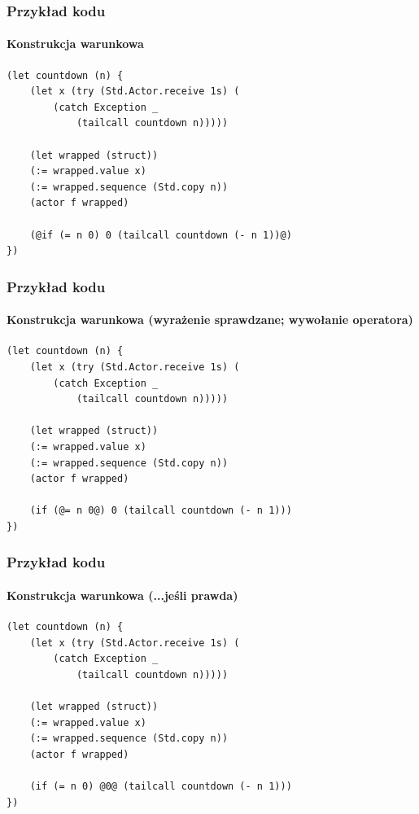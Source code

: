 \documentclass[aspectratio=169]{beamer}
\begin{document}
\begin{frame}[fragile]
    \frametitle{Przykład kodu}
    \framesubtitle{Konstrukcja warunkowa}

    \begin{small}
    \begin{lstlisting}
(let countdown (n) {
    (let x (try (Std.Actor.receive 1s) (
        (catch Exception _
            (tailcall countdown n)))))

    (let wrapped (struct))
    (:= wrapped.value x)
    (:= wrapped.sequence (Std.copy n))
    (actor f wrapped)

    (@if (= n 0) 0 (tailcall countdown (- n 1))@)
})
    \end{lstlisting}
    \end{small}
\end{frame}

\begin{frame}[fragile]
    \frametitle{Przykład kodu}
    \framesubtitle{Konstrukcja warunkowa (wyrażenie sprawdzane; wywołanie operatora)}

    \begin{small}
    \begin{lstlisting}
(let countdown (n) {
    (let x (try (Std.Actor.receive 1s) (
        (catch Exception _
            (tailcall countdown n)))))

    (let wrapped (struct))
    (:= wrapped.value x)
    (:= wrapped.sequence (Std.copy n))
    (actor f wrapped)

    (if (@= n 0@) 0 (tailcall countdown (- n 1)))
})
    \end{lstlisting}
    \end{small}
\end{frame}

\begin{frame}[fragile]
    \frametitle{Przykład kodu}
    \framesubtitle{Konstrukcja warunkowa (...jeśli prawda)}

    \begin{small}
    \begin{lstlisting}
(let countdown (n) {
    (let x (try (Std.Actor.receive 1s) (
        (catch Exception _
            (tailcall countdown n)))))

    (let wrapped (struct))
    (:= wrapped.value x)
    (:= wrapped.sequence (Std.copy n))
    (actor f wrapped)

    (if (= n 0) @0@ (tailcall countdown (- n 1)))
})
    \end{lstlisting}
    \end{small}
\end{frame}
\end{document}
